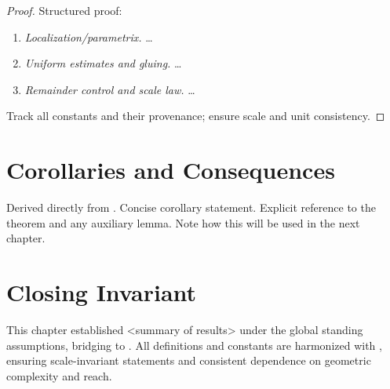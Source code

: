 \begin{proof}
Structured proof:
\begin{enumerate}
  \item \textit{Localization/parametrix.} …
  \item \textit{Uniform estimates and gluing.} …
  \item \textit{Remainder control and scale law.} …
\end{enumerate}
Track all constants and their provenance; ensure scale and unit consistency.
\end{proof}

\section{Corollaries and Consequences}

\begin{corollary}\label{cor:<label>}
\Orientation Derived directly from .
\Statement Concise corollary statement.
\Audit Explicit reference to the theorem and any auxiliary lemma.
\Closure Note how this will be used in the next chapter.
\end{corollary}

\section*{Closing Invariant}
This chapter established <summary of results> under the global standing assumptions,
bridging  to . All definitions and constants
are harmonized with , ensuring scale-invariant statements and
consistent dependence on geometric complexity and reach.
